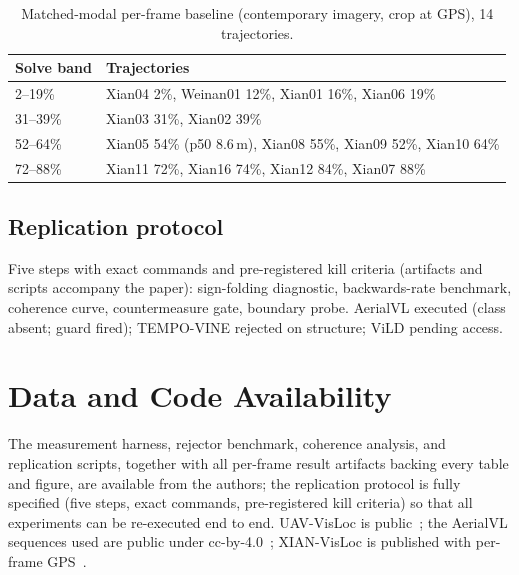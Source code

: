 \documentclass[journal]{IEEEtran}
\begin{document}
\begin{table}[t]
\caption{Matched-modal per-frame baseline (contemporary imagery, crop at GPS), 14 trajectories.}
\label{tab:matchedmodal}
\centering
\footnotesize
\setlength{\tabcolsep}{3pt}
\begin{tabular}{@{}l>{\raggedright\arraybackslash}p{2.55in}@{}}
\toprule
Solve band & Trajectories \\
\midrule
2--19\% & Xian04 2\%, Weinan01 12\%, Xian01 16\%, Xian06 19\% \\
31--39\% & Xian03 31\%, Xian02 39\% \\
52--64\% & Xian05 54\% (p50 8.6\,m), Xian08 55\%, Xian09 52\%, Xian10 64\% \\
72--88\% & Xian11 72\%, Xian16 74\%, Xian12 84\%, Xian07 88\% \\
\bottomrule
\end{tabular}
\end{table}

\subsection{Replication protocol}
\label{sec:app-protocol}
Five steps with exact commands and pre-registered kill criteria (artifacts and scripts accompany the paper): sign-folding diagnostic, backwards-rate benchmark, coherence curve, countermeasure gate, boundary probe. AerialVL executed (class absent; guard fired); TEMPO-VINE rejected on structure; ViLD pending access.

\section*{Data and Code Availability}
The measurement harness, rejector benchmark, coherence analysis, and replication scripts, together with all per-frame result artifacts backing every table and figure, are available from the authors; the replication protocol is fully specified (five steps, exact commands, pre-registered kill criteria) so that all experiments can be re-executed end to end. UAV-VisLoc is public~\cite{uavvisloc}; the AerialVL sequences used are public under cc-by-4.0~\cite{aerialvl}; XIAN-VisLoc is published with per-frame GPS~\cite{xianvisloc}.



\end{document}
